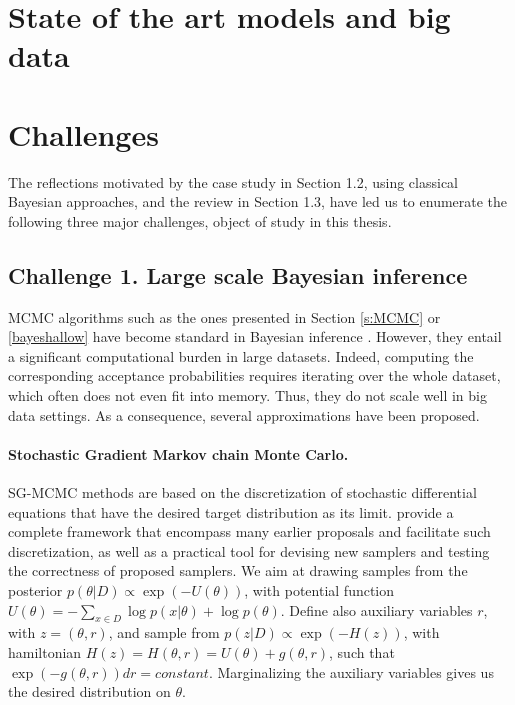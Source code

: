 \section{State of the art models and big data}\label{sec:deep_intro}


\section{Challenges}

The reflections motivated by the case study in Section 1.2, using classical Bayesian approaches, and the review in Section 1.3, have led us to enumerate the following three major challenges, object of study in this thesis.

\subsection{Challenge 1. Large scale Bayesian inference}


MCMC algorithms such as the ones presented in Section \ref{s:MCMC} or \ref{bayeshallow} 
have become standard in Bayesian inference \parencite{french}.
However, they entail a significant computational burden in large datasets. Indeed, 
computing the corresponding acceptance probabilities 
 requires iterating over the whole dataset, which often does not even
 fit into memory. Thus, they 
  do not scale well in big data settings. 
 As a consequence, several approximations have been proposed.

\paragraph{Stochastic Gradient Markov chain Monte Carlo.}\label{bayesdeep} 

SG-MCMC methods are based on the discretization of 
stochastic differential equations that have the desired target 
distribution as its limit. \cite{ma2015complete} provide a
complete framework that encompass many earlier proposals and
facilitate such discretization, as well as a practical tool for
devising new samplers and testing the correctness of proposed samplers.
We aim at drawing samples from the
posterior $p(\theta |D) \propto \exp(-U(\theta ))$,
with potential function
$U(\theta ) = -\sum _{x\in D} \log p(x|\theta ) + \log p(\theta )$. Define also auxiliary variables $r$,
with $z=( \theta, r )$, and sample from $p(z|D) \propto  \exp(-H(z))$, with hamiltonian
$H(z) = H(\theta , r) = U(\theta ) + g(\theta , r)$, such that
$\exp(-g(\theta , r))dr = constant$. 
Marginalizing the auxiliary variables gives us the desired distribution on $\theta $.


